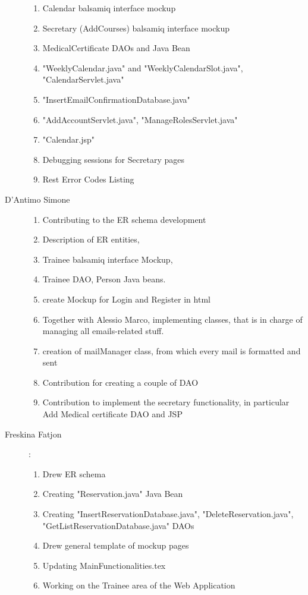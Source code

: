 \begin{description}
\begin{flushleft}
\begin{enumerate}
			\item Calendar balsamiq interface mockup
			\item Secretary (AddCourses) balsamiq interface mockup
			\item MedicalCertificate DAOs and Java Bean
			\item "WeeklyCalendar.java" and "WeeklyCalendarSlot.java", "CalendarServlet.java"
			\item "InsertEmailConfirmationDatabase.java"
			\item "AddAccountServlet.java", "ManageRolesServlet.java"
			\item "Calendar.jsp"
			\item Debugging sessions for Secretary pages		 		
			\item Rest Error Codes Listing
		\end{enumerate}
	\end{flushleft}
	\item[D'Antimo Simone] 
	\begin{enumerate}
		\item Contributing to the ER schema development
		\item Description of ER entities,
		\item Trainee balsamiq interface Mockup,
		\item Trainee DAO, Person Java beans.
		\item create Mockup for Login and Register in html
		\item Together with Alessio Marco, implementing classes, that is in charge of managing all emails-related stuff.
		\item creation of mailManager class, from which every mail is formatted and sent
	    \item Contribution for creating a couple of DAO
	    \item Contribution to implement the secretary functionality, in particular Add Medical certificate DAO and JSP
	\end{enumerate}
	\item[Freskina Fatjon] :
	\begin{enumerate}
		\item Drew ER schema 
		\item Creating "Reservation.java" Java Bean 
		\item Creating "InsertReservationDatabase.java", "DeleteReservation.java", "GetListReservationDatabase.java" DAOs
		\item Drew general template of mockup pages 
		\item Updating MainFunctionalities.tex
		\item Working on the Trainee area of the Web Application
	\end{enumerate} 
	

\end{description}
